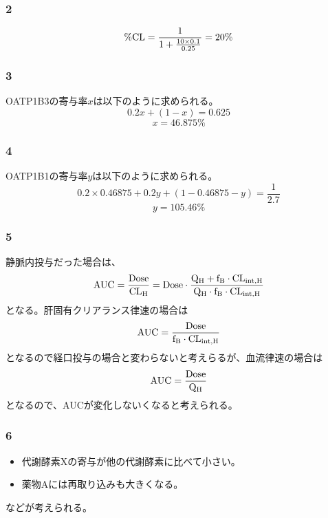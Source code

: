 \documentclass[a4paper,papersize,dvipdfmx]{jsarticle}
\begin{document}
\subsubsection*{2}
\[\rm \%CL = \frac{1}{1+\frac{10 \times 0.1}{0.25}} = 20 \%\]

\subsubsection*{3}
OATP1B3の寄与率$x$は以下のように求められる。
\[0.2x + (1-x) = 0.625\]
\[x = 46.875\%\]

\subsubsection*{4}
OATP1B1の寄与率$y$は以下のように求められる。
\[0.2 \times 0.46875 + 0.2y + (1-0.46875-y) = \frac{1}{2.7}\]
\[y = 105.46\%\]

\subsubsection*{5}
静脈内投与だった場合は、
\[\rm AUC = \frac{Dose}{CL_H} = Dose \cdot \frac{Q_H + f_B \cdot CL_{int,H}}{Q_H \cdot f_B \cdot CL_{int,H}}\]
となる。肝固有クリアランス律速の場合は
\[\rm AUC = \frac{Dose}{f_B \cdot CL_{int,H}} \]
となるので経口投与の場合と変わらないと考えらるが、血流律速の場合は
\[\rm AUC =\frac{Dose}{Q_H} \]
となるので、AUCが変化しないくなると考えられる。

\subsubsection*{6}
\begin{itemize}
\item 代謝酵素Xの寄与が他の代謝酵素に比べて小さい。
\item 薬物Aには再取り込みも大きくなる。
\end{itemize}
などが考えられる。
\end{document}
